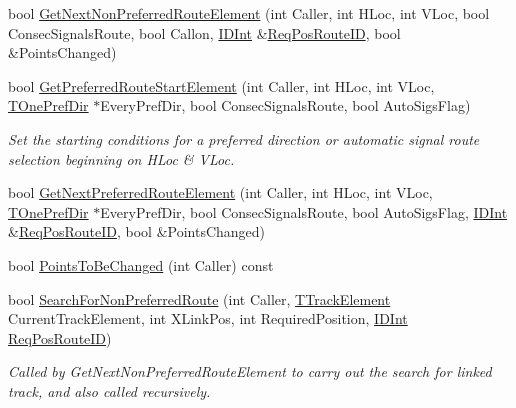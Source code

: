 \begin{DoxyCompactItemize}
bool \mbox{\hyperlink{class_t_one_route_a997f3cb02d8e03d0a12769b8eb903674}{Get\+Next\+Non\+Preferred\+Route\+Element}} (int Caller, int H\+Loc, int V\+Loc, bool Consec\+Signals\+Route, bool Callon, \mbox{\hyperlink{class_i_d_int}{I\+D\+Int}} \&\mbox{\hyperlink{class_t_one_route_aee7b2c91e9920bbb59c84cb562f0680a}{Req\+Pos\+Route\+ID}}, bool \&Points\+Changed)
\item 
\mbox{\label{class_t_one_route_a07ee58454e2f49b4f0d5d8e6a1a2d40f}} 
bool \mbox{\hyperlink{class_t_one_route_a07ee58454e2f49b4f0d5d8e6a1a2d40f}{Get\+Preferred\+Route\+Start\+Element}} (int Caller, int H\+Loc, int V\+Loc, \mbox{\hyperlink{class_t_one_pref_dir}{T\+One\+Pref\+Dir}} $\ast$Every\+Pref\+Dir, bool Consec\+Signals\+Route, bool Auto\+Sigs\+Flag)
\begin{DoxyCompactList}\small\item\em Set the starting conditions for a preferred direction or automatic signal route selection beginning on H\+Loc \& V\+Loc. \end{DoxyCompactList}\item 
bool \mbox{\hyperlink{class_t_one_route_af1794f576d8aff59f83992afc1c5acc2}{Get\+Next\+Preferred\+Route\+Element}} (int Caller, int H\+Loc, int V\+Loc, \mbox{\hyperlink{class_t_one_pref_dir}{T\+One\+Pref\+Dir}} $\ast$Every\+Pref\+Dir, bool Consec\+Signals\+Route, bool Auto\+Sigs\+Flag, \mbox{\hyperlink{class_i_d_int}{I\+D\+Int}} \&\mbox{\hyperlink{class_t_one_route_aee7b2c91e9920bbb59c84cb562f0680a}{Req\+Pos\+Route\+ID}}, bool \&Points\+Changed)
\item 
bool \mbox{\hyperlink{class_t_one_route_a077235e61d88fb865f5f9eaf09f275e6}{Points\+To\+Be\+Changed}} (int Caller) const
\item 
\mbox{\label{class_t_one_route_a59270c9b68d679ea29086216c21decfb}} 
bool \mbox{\hyperlink{class_t_one_route_a59270c9b68d679ea29086216c21decfb}{Search\+For\+Non\+Preferred\+Route}} (int Caller, \mbox{\hyperlink{class_t_track_element}{T\+Track\+Element}} Current\+Track\+Element, int X\+Link\+Pos, int Required\+Position, \mbox{\hyperlink{class_i_d_int}{I\+D\+Int}} \mbox{\hyperlink{class_t_one_route_aee7b2c91e9920bbb59c84cb562f0680a}{Req\+Pos\+Route\+ID}})
\begin{DoxyCompactList}\small\item\em Called by Get\+Next\+Non\+Preferred\+Route\+Element to carry out the search for linked track, and also called recursively. \end{DoxyCompactList}\item 

\end{DoxyCompactItemize}
